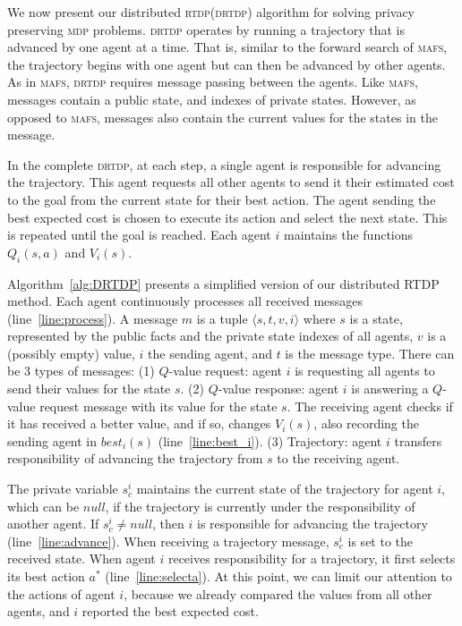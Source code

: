 \documentclass[letterpaper]{article} %
\newcommand{\mafs}{\textsc {mafs}\xspace}
\newcommand{\rtdp}{\textsc {rtdp}\xspace}
\newcommand{\drtdp}{\textsc {drtdp}\xspace}
\newcommand{\mdp}{\textsc {mdp}\xspace}
\theoremstyle{remark}
\begin{document}
We now present our distributed \rtdp (\drtdp) algorithm for solving privacy preserving \mdp problems. \drtdp operates by running a trajectory that is advanced by one agent at a time. That is, similar to the forward search of \mafs, the trajectory begins with one agent but can then be advanced by other agents. As in \mafs, \drtdp requires message passing between the agents. Like \mafs, messages contain a public state, and indexes of private states. However, as opposed to \mafs, messages also contain the current values for the states in the message.

In the complete \drtdp, at each step, a single agent is responsible for advancing the trajectory. This agent requests all other agents to send it their estimated cost to the goal from the current state for their best action. The agent sending the best expected cost is chosen to execute its action and select the next state. This is repeated until the goal is reached.
Each agent $i$ maintains the functions $Q_i(s,a)$ and $V_i(s)$.

Algorithm~\ref{alg:DRTDP} presents a simplified version of our distributed RTDP method. Each agent continuously processes all received messages (line~\ref{line:process}). A message $m$ is a tuple $\langle s, t, v, i \rangle$ where $s$ is a state, represented by the public facts and the private state indexes of all agents, $v$ is a (possibly empty) value, $i$ the sending agent, and $t$ is the message type.
There can be 3 types of messages:
(1) $Q$-value request: agent $i$ is requesting all agents to send their values for the state $s$.
(2) $Q$-value response: agent $i$ is answering a $Q$-value request message with its value for the state $s$. The receiving agent checks if it has received a better value, and if so, changes $V_i(s)$, also recording the sending agent in $best_i(s)$ (line~\ref{line:best_i}).
(3) Trajectory: agent $i$ transfers responsibility of advancing the trajectory from  $s$ to the receiving agent.

The private variable $s^i_c$ maintains the current state of the trajectory for agent $i$, which can be $null$, if the trajectory is currently under the responsibility of another agent. If $s^i_c \neq null$, then $i$ is responsible for advancing the trajectory (line~\ref{line:advance}). When receiving a trajectory message, $s^i_c$ is set to the received state.
When agent $i$ receives responsibility for a trajectory, it first selects its best action $a^*$ (line~\ref{line:selecta}). At this point, we can limit our attention to the actions of agent $i$, because we already compared the values from all other agents, and $i$ reported the best expected cost.
\end{document}
